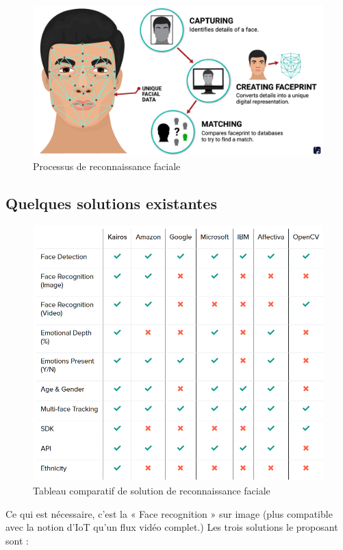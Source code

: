 \begin{figure}[H]
	\centering
	\includegraphics[width=12cm]{images/proto-5.png}
	\caption{Processus de reconnaissance faciale}
	\label{fig:arealytics}
\end{figure}

\subsection{Quelques solutions existantes}
\begin{figure}[H]
	\centering
	\includegraphics[width=12cm]{images/proto-4.png}
	\caption{Tableau comparatif de solution de reconnaissance faciale}
	\label{fig:tab-comparatif-reco}
\end{figure}

Ce qui est nécessaire, c’est la « Face recognition » sur image (plus compatible avec la notion d’IoT qu’un flux vidéo
complet.) Les trois solutions le proposant sont :

